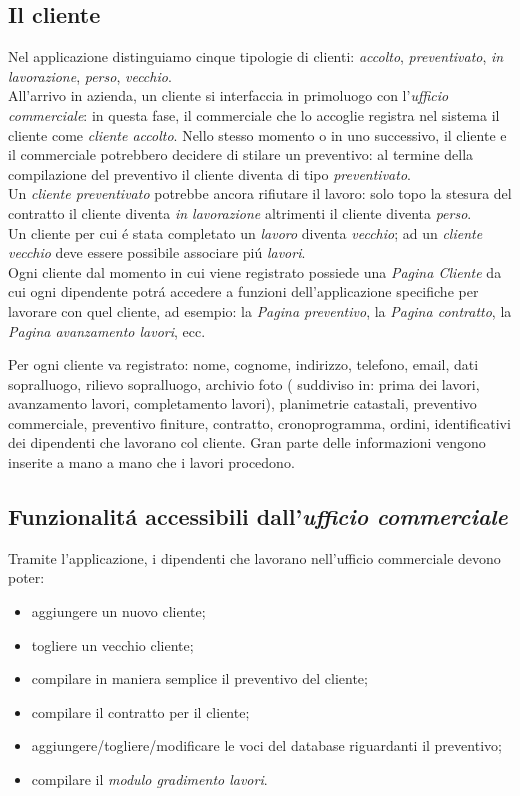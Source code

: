 \documentclass[paper=a4, fontsize=11pt]{scrartcl} %
\numberwithin{equation}{section} %
\numberwithin{figure}{section} %
\numberwithin{table}{section} %
\begin{document}
\newpage
\subsection{Il cliente}
Nel applicazione distinguiamo cinque tipologie di clienti: \textit{accolto},
\textit{preventivato}, \textit{in lavorazione}, \textit{perso}, \textit{vecchio}.\\
All'arrivo in azienda, un cliente si interfaccia in primoluogo con l'\textit{ufficio commerciale}:
in questa fase, il commerciale che lo accoglie registra nel sistema il cliente come \textit{cliente accolto}.
Nello stesso momento o in uno successivo, il cliente e il commerciale potrebbero decidere di stilare un preventivo:
al termine della compilazione del preventivo il cliente diventa di tipo \textit{preventivato}.\\
Un \textit{cliente preventivato} potrebbe ancora rifiutare il lavoro: solo topo la stesura del contratto il cliente diventa
\textit{in lavorazione} altrimenti il cliente diventa \textit{perso}.\\
Un cliente per cui \'e stata completato un \textit{lavoro} diventa \textit{vecchio}; ad un \textit{cliente vecchio}
deve essere possibile associare pi\'u \textit{lavori}.\\
Ogni cliente dal momento in cui viene registrato possiede una \textit{Pagina Cliente} da cui
ogni dipendente potr\'a accedere a funzioni dell'applicazione specifiche per lavorare con quel cliente, ad esempio: la
\textit{Pagina preventivo}, la \textit{Pagina contratto}, la \textit{Pagina avanzamento lavori}, ecc.

Per ogni cliente va registrato: nome, cognome, indirizzo, telefono, email, dati sopralluogo,
rilievo sopralluogo, archivio foto ( suddiviso in: prima dei lavori, avanzamento lavori,
completamento lavori), planimetrie catastali, preventivo commerciale, preventivo
finiture, contratto, cronoprogramma, ordini, identificativi dei dipendenti che lavorano
col cliente.
Gran parte delle informazioni vengono inserite a mano a mano che i lavori procedono.


\subsection{Funzionalit\'a accessibili dall'\textit{ufficio commerciale}}

Tramite l'applicazione, i dipendenti che lavorano nell'ufficio commerciale
devono poter:
\begin{itemize}
    \item aggiungere un nuovo cliente;
    \item togliere un vecchio cliente;
    \item compilare in maniera semplice il preventivo del cliente;
    \item compilare il contratto per il cliente;
    \item aggiungere/togliere/modificare le voci del database riguardanti il preventivo;
    \item compilare il \textit{modulo gradimento lavori}.
\end{itemize}
\end{document}
